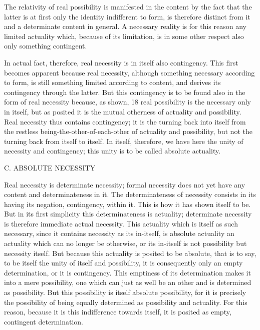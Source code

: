 The relativity of real possibility is manifested in the content
by the fact that the latter is at first only
the identity indifferent to form,
is therefore distinct from it
and a determinate content in general.
A necessary reality is for this reason any limited actuality
which, because of its limitation, is in some other respect
also only something contingent.

In actual fact, therefore, real necessity is in itself also contingency.
This first becomes apparent because real necessity,
although something necessary according to form,
is still something limited according to content,
and derives its contingency through the latter.
 But this contingency is to be
found also in the form of real necessity because, as shown, 18 real possibility
is the necessary only in itself,
but as posited it is the mutual otherness of
actuality and possibility.
Real necessity thus contains contingency;
it is the turning back into itself from the restless
being-the-other-of-each-other of actuality and possibility,
but not the turning back from itself to itself.
In itself, therefore, we have here the unity of necessity and contingency;
this unity is to be called absolute actuality.


C. ABSOLUTE NECESSITY

Real necessity is determinate necessity;
formal necessity does not yet have any content and determinateness in it.
The determinateness of necessity consists in
its having its negation, contingency, within it.
This is how it has shown itself to be.
But in its first simplicity this determinateness is actuality;
determinate necessity is therefore immediate actual necessity.
This actuality which is itself as such necessary,
since it contains necessity as its in-itself, is absolute actuality
an actuality which can no longer be otherwise,
or its in-itself is not possibility but necessity itself.
But because this actuality is posited to be absolute, that is to say, to
be itself the unity of itself and possibility, it is consequently only an empty
determination, or it is contingency.
This emptiness of its determination
makes it into a mere possibility,
one which can just as well be an other and
is determined as possibility.
But this possibility is itself absolute possibility,
for it is precisely the possibility of being
equally determined as possibility and actuality.
For this reason, because it is this indifference towards itself,
it is posited as empty, contingent determination.

